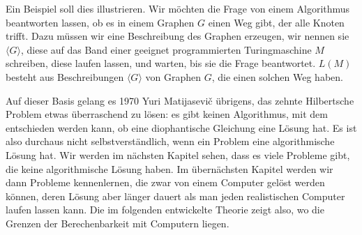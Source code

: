 Ein Beispiel soll dies illustrieren. Wir möchten die Frage
von einem Algorithmus beantworten lassen, ob es in einem Graphen $G$
einen Weg gibt, der alle Knoten trifft.  Dazu müssen wir eine
Beschreibung des Graphen erzeugen, wir nennen sie $\langle G\rangle$,
diese auf das Band einer geeignet programmierten Turingmaschine $M$ schreiben,
diese laufen lassen, und warten, bis sie die Frage beantwortet. $L(M)$
besteht aus Beschreibungen $\langle G\rangle$ von Graphen $G$, die
einen solchen Weg haben.

Auf dieser Basis gelang es 1970 Yuri Matijasevi\v c übrigens,
das zehnte Hilbertsche Problem etwas überraschend zu lösen: es gibt
keinen Algorithmus, mit dem entschieden werden kann, ob eine
diophantische Gleichung eine Lösung hat. Es ist also durchaus
nicht selbstverständlich, wenn ein Problem eine algorithmische
Lösung hat. Wir werden im nächsten Kapitel sehen, dass es viele
Probleme gibt, die keine algorithmische Lösung haben. Im übernächsten
Kapitel werden wir dann Probleme kennenlernen, die zwar von einem Computer
gelöst werden können, deren Lösung aber länger dauert als man
jeden realistischen Computer laufen lassen kann.
Die im folgenden entwickelte Theorie zeigt also, wo die Grenzen
der Berechenbarkeit mit Computern liegen.
